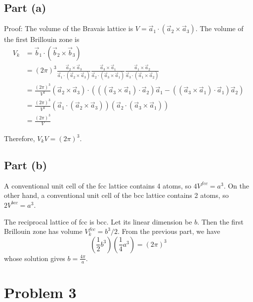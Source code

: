 \documentclass{article}
\begin{document}
\subsection{Part (a)}
Proof: The volume of the Bravais lattice is $V=\vec{a}_1\cdot(\vec{a}_2\times\vec{a}_3)$. The volume of the first Brillouin zone is
\begin{align*}
	V_k&=\vec{b}_1\cdot(\vec{b}_2\times\vec{b}_3)\\
	&=(2\pi)^3\frac{\vec{a}_2\times\vec{a}_3}{\vec{a}_1\cdot(\vec{a}_2\times\vec{a}_3)}\frac{\vec{a}_3\times\vec{a}_1}{\vec{a}_2\cdot(\vec{a}_3\times\vec{a}_1)}\frac{\vec{a}_1\times\vec{a}_2}{\vec{a}_3\cdot(\vec{a}_1\times\vec{a}_2)}\\
	&=\frac{(2\pi)^3}{V^3}(\vec{a}_2\times\vec{a}_3)\cdot(((\vec{a}_3\times\vec{a}_1)\cdot\vec{a}_2)\vec{a}_1-((\vec{a}_3\times\vec{a}_1)\cdot\vec{a}_1)\vec{a}_2)\\
	&=\frac{(2\pi)^3}{V^3}(\vec{a}_1\cdot(\vec{a}_2\times\vec{a}_3))(\vec{a}_2\cdot(\vec{a}_3\times\vec{a}_1))\\
	&=\frac{(2\pi)^3}{V}
\end{align*}

Therefore, $V_kV=(2\pi)^3$.

\subsection{Part (b)}
A conventional unit cell of the fcc lattice contains 4 atoms, so $4V^{fcc}=a^3$. On the other hand, a conventional unit cell of the bcc lattice contains 2 atoms, so $2V^{bcc}=a^3$.

The reciprocal lattice of fcc is bcc. Let its linear dimension be $b$. Then the first Brillouin zone has volume $V_k^{fcc}=b^3/2$. From the previous part, we have
\begin{equation*}
	\left(\frac{1}{2}b^3\right)\left(\frac{1}{4}a^3\right)=(2\pi)^3
\end{equation*}
whose solution gives $b=\frac{4\pi}{a}$.

\section{Problem 3}
\end{document}
